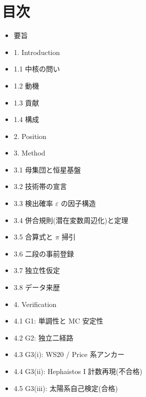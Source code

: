 \documentclass[11pt]{article}
\begin{document}
\section*{目次}
\begin{itemize}\setlength{\itemsep}{0pt}
\item[] 要旨
\item[] 1. Introduction
\item[] \hspace{1.2em}1.1 中核の問い
\item[] \hspace{1.2em}1.2 動機
\item[] \hspace{1.2em}1.3 貢献
\item[] \hspace{1.2em}1.4 構成
\item[] 2. Position
\item[] 3. Method
\item[] \hspace{1.2em}3.1 母集団と恒星基盤
\item[] \hspace{1.2em}3.2 技術帯の宣言
\item[] \hspace{1.2em}3.3 検出確率 \(\varepsilon\) の因子構造
\item[] \hspace{1.2em}3.4 併合規則(潜在変数周辺化)と定理
\item[] \hspace{1.2em}3.5 合算式と \(\pi\) 掃引
\item[] \hspace{1.2em}3.6 二段の事前登録
\item[] \hspace{1.2em}3.7 独立性仮定
\item[] \hspace{1.2em}3.8 データ来歴
\item[] 4. Verification
\item[] \hspace{1.2em}4.1 G1: 単調性と MC 安定性
\item[] \hspace{1.2em}4.2 G2: 独立二経路
\item[] \hspace{1.2em}4.3 G3(i): WS20 / Price 系アンカー
\item[] \hspace{1.2em}4.4 G3(ii): Hephaistos I 計数再現(不合格)
\item[] \hspace{1.2em}4.5 G3(iii): 太陽系自己検定(合格)

\end{itemize}
\end{document}
